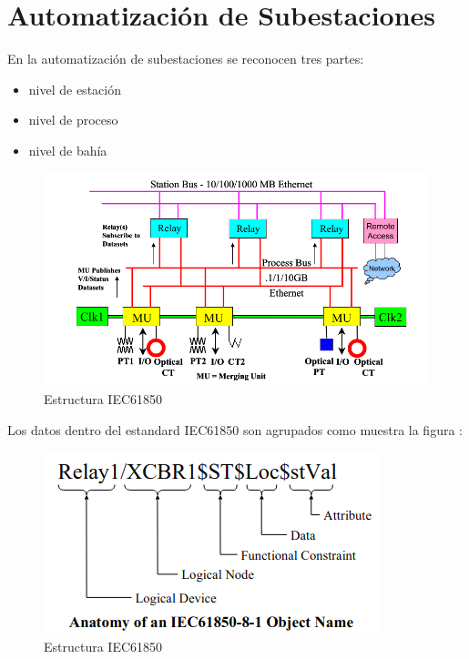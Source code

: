 \documentclass[a5paper]{book}%
\begin{document}
\section{Automatización de Subestaciones}

En la automatización de subestaciones se reconocen  tres partes:

\begin{itemize}
\item nivel de estación 
\item nivel de proceso
\item nivel de bahía
\end{itemize}

\begin{figure}[H]
  \centering
  
  \caption{Estructura IEC61850}
  \label{fig:iec61850}
  \includegraphics[width=\linewidth]{iec61850}
\end{figure}

Los datos  dentro del estandard IEC61850 son agrupados como muestra la figura :

\begin{figure}[H]
  \centering
  \caption{Estructura IEC61850}
  \label{fig:iec61850}
  \includegraphics[width=\linewidth]{anatomia_iec}
\end{figure}
\end{document}
